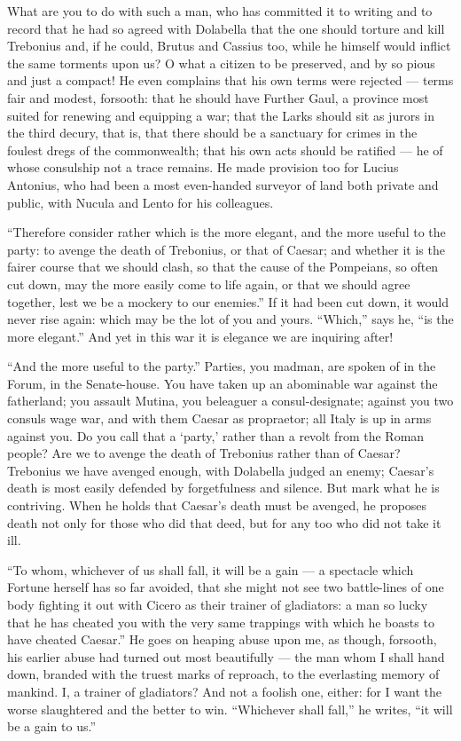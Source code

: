  What are you to do with such a man, who has committed it to writing and to record that he had so agreed with Dolabella that the one should torture and kill Trebonius and, if he could, Brutus and Cassius too, while he himself would inflict the same torments upon us? O what a citizen to be preserved, and by so pious and just a compact! He even complains that his own terms were rejected --- terms fair and modest, forsooth: that he should have Further Gaul, a province most suited for renewing and equipping a war; that the Larks should sit as jurors in the third decury, that is, that there should be a sanctuary for crimes in the foulest dregs of the commonwealth; that his own acts should be ratified --- he of whose consulship not a trace remains. He made provision too for Lucius Antonius, who had been a most even-handed surveyor of land both private and public, with Nucula and Lento for his colleagues.

 ``Therefore consider rather which is the more elegant, and the more useful to the party: to avenge the death of Trebonius, or that of Caesar; and whether it is the fairer course that we should clash, so that the cause of the Pompeians, so often cut down, may the more easily come to life again, or that we should agree together, lest we be a mockery to our enemies.'' If it had been cut down, it would never rise again: which may be the lot of you and yours. ``Which,'' says he, ``is the more elegant.'' And yet in this war it is elegance we are inquiring after!

 ``And the more useful to the party.'' Parties, you madman, are spoken of in the Forum, in the Senate-house. You have taken up an abominable war against the fatherland; you assault Mutina, you beleaguer a consul-designate; against you two consuls wage war, and with them Caesar as propraetor; all Italy is up in arms against you. Do you call that a `party,' rather than a revolt from the Roman people? Are we to avenge the death of Trebonius rather than of Caesar? Trebonius we have avenged enough, with Dolabella judged an enemy; Caesar's death is most easily defended by forgetfulness and silence. But mark what he is contriving. When he holds that Caesar's death must be avenged, he proposes death not only for those who did that deed, but for any too who did not take it ill.

 ``To whom, whichever of us shall fall, it will be a gain --- a spectacle which Fortune herself has so far avoided, that she might not see two battle-lines of one body fighting it out with Cicero as their trainer of gladiators: a man so lucky that he has cheated you with the very same trappings with which he boasts to have cheated Caesar.'' He goes on heaping abuse upon me, as though, forsooth, his earlier abuse had turned out most beautifully --- the man whom I shall hand down, branded with the truest marks of reproach, to the everlasting memory of mankind. I, a trainer of gladiators? And not a foolish one, either: for I want the worse slaughtered and the better to win. ``Whichever shall fall,'' he writes, ``it will be a gain to us.''

